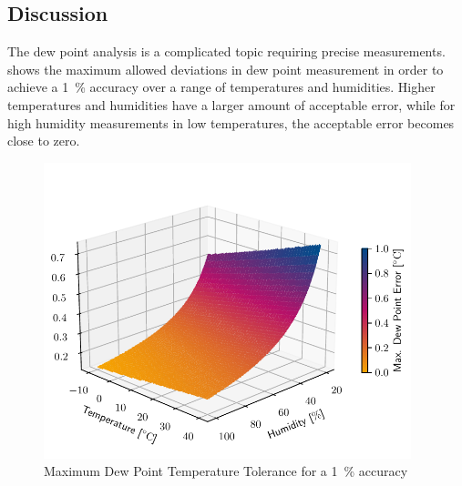 \subsection{Discussion}
The dew point analysis is a complicated topic requiring precise measurements.  shows the maximum allowed deviations in dew point measurement in order to achieve a \qty{1}{\percent} accuracy over a range of temperatures and humidities. Higher temperatures and humidities have a larger amount of acceptable error, while for high humidity measurements in low temperatures, the acceptable error becomes close to zero.  
\begin{figure}[h]
    \centering
    \includegraphics[clip, trim=0cm 0cm 0cm 1cm, width=0.95\textwidth]{graphs/dew_deviation.pdf}
    \caption{Maximum Dew Point Temperature Tolerance for a \qty{1}{\percent} accuracy}
    \label{acceptable_error}
\end{figure}